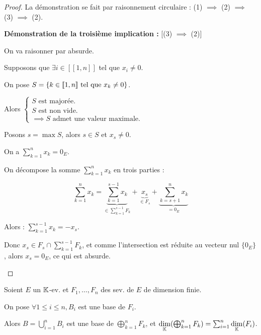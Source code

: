 \documentclass[12pt,a4paper]{report}
\begin{document}
\begin{proof}
    La démonstration se fait par raisonnement circulaire : (1) $\implies$ (2) $\implies$ (3) $\implies$ (2).

    \begin{outline}

        \1 \textbf{Démonstration de la troisième implication :} [(3) $\implies$ (2)]

        On va raisonner par absurde.

        Supposons que $\exists i \in [\![1,n]\!]$ tel que $x_i \ne 0$.


        On pose $S = \{ k \in [\![1,n]\!] \text{ tel que } x_k \ne 0\}$.


        Alors $\begin{cases}
            S \text{ est majorée.}\\
            S \text{ est non vide.}\\
            \implies S \text{ admet une valeur maximale.}
        \end{cases}$

        Posons $s = \max S$, alors $s \in S$ et $x_s \ne 0$.
        
        On a $\sum_{k=1}^n x_k = 0_E$.

        On décompose la somme $\sum_{k=1}^n x_k$ en trois parties :
        
        $$\sum_{k=1}^n x_k = \underbrace{\sum_{k=1}^{s-1} x_k}_{\in \sum_{k=1}^{s-1} F_k} + \underbrace{x_s}_{\in F_s} + \underbrace{\sum_{k=s+1}^n x_k}_{= 0_E}$$

        Alors : $\sum_{k=1}^{s-1} x_k = -x_s$.

        Donc $x_s \in F_s \cap \sum_{k=1}^{s-1} F_k$, et comme l'intersection est réduite au vecteur nul $\{0_E\}$, alors $x_s = 0_E$, ce qui est absurde.
    \end{outline}
\end{proof}

\begin{theorem}
    Soient $E$ un $\mathbb{K}$-ev. et $F_1,\dots,F_n$ des sev. de $E$ de dimension finie.

    On pose $\forall 1 \le i \le n, B_i$ est une base de $F_i$.

    Alors $B = \bigcup_{i=1}^n B_i$ est une base de $\bigoplus_{k=1}^n F_k$, et $\underset{\mathbb{K}}\dim(\bigoplus_{k=1}^n F_k) = \sum_{i=1}^n \underset{\mathbb{K}}\dim(F_i)$.
\end{theorem}
\end{document}
